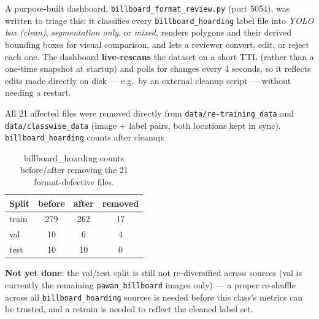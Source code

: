 \documentclass[11pt]{article}
\begin{document}
A purpose-built dashboard, \texttt{billboard\_format\_review.py} (port 5054), was written
to triage this: it classifies every \texttt{billboard\_hoarding} label file into
\emph{YOLO box (clean)}, \emph{segmentation only}, or \emph{mixed}, renders polygons and
their derived bounding boxes for visual comparison, and lets a reviewer convert, edit, or
reject each one. The dashboard \textbf{live-rescans} the dataset on a short TTL (rather
than a one-time snapshot at startup) and polls for changes every 4 seconds, so it reflects
edits made directly on disk — e.g.\ by an external cleanup script — without needing a
restart.

All 21 affected files were removed directly from \texttt{data/re-training\_data} and
\texttt{data/classwise\_data} (image + label pairs, both locations kept in sync).
\texttt{billboard\_hoarding} counts after cleanup:

\begin{table}[H]
\centering
\caption{billboard\_hoarding counts before/after removing the 21 format-defective files.}
\begin{tabular}{lccc}
\toprule
\textbf{Split} & \textbf{before} & \textbf{after} & \textbf{removed} \\
\midrule
train & 279 & 262 & 17 \\
val   & 10  & 6   & 4 \\
test  & 10  & 10  & 0 \\
\bottomrule
\end{tabular}
\end{table}

\noindent\textbf{Not yet done}: the val/test split is still not re-diversified across
sources (val is currently the remaining \texttt{pawan\_billboard} images only) — a proper
re-shuffle across all \texttt{billboard\_hoarding} sources is needed before this class's
metrics can be trusted, and a retrain is needed to reflect the cleaned label set.

\end{document}
